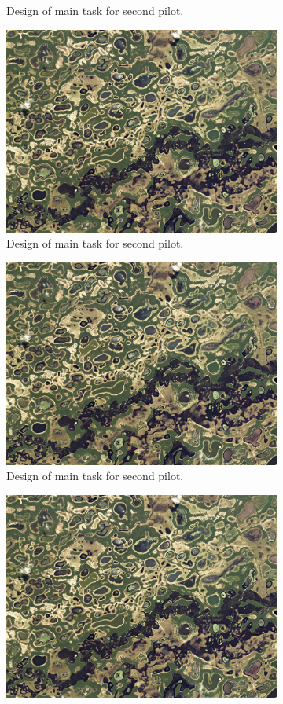 \begin{figure}[h]
\begin{subfigure}{0.5\textwidth}
  \caption{Design of main task for second pilot.}
  \label{v2.requirement.examples.3}
\end{subfigure}
\begin{subfigure}{0.5\textwidth}
  \centering
  \includegraphics[width=.8\linewidth]{pantanal.jpeg}  
  \caption{Design of main task for second pilot.}
  \label{v2.requirement.examples.4}
\end{subfigure}
\newline
\begin{subfigure}{0.5\textwidth}
  \centering
  \includegraphics[width=.8\linewidth]{pantanal.jpeg}  
  \caption{Design of main task for second pilot.}
  \label{v2.requirement.examples.5}
\end{subfigure}
\begin{subfigure}{0.5\textwidth}
  \centering
  \includegraphics[width=.8\linewidth]{pantanal.jpeg}  

\end{subfigure}
\end{figure}
